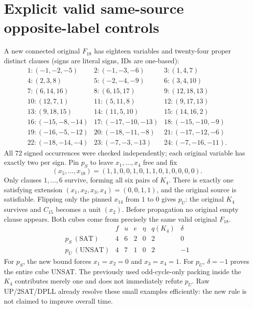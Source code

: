 \documentclass[11pt]{article}
\begin{document}
\section{Explicit valid same-source opposite-label controls}
A new connected original $F_{18}$ has eighteen variables and twenty-four proper distinct clauses (signs are literal signs, IDs are one-based):
\[
\begin{array}{rll}
1:(-1,-2,-5)&2:(-1,-3,-6)&3:(1,4,7)\\
4:(2,3,8)&5:(-2,-4,-9)&6:(3,4,10)\\
7:(6,14,16)&8:(6,15,17)&9:(12,18,13)\\
10:(12,7,1)&11:(5,11,8)&12:(9,17,13)\\
13:(9,18,15)&14:(11,5,10)&15:(14,16,2)\\
16:(-15,-8,-14)&17:(-17,-10,-13)&18:(-15,-10,-9)\\
19:(-16,-5,-12)&20:(-18,-11,-8)&21:(-17,-12,-6)\\
22:(-18,-14,-4)&23:(-7,-3,-13)&24:(-7,-16,-11).
\end{array}
\]
All $72$ signed occurrences were checked independently; each original variable has exactly two per sign. Pin $p_S$ to leave $x_1,\ldots,x_4$ free and fix
\[
(x_5,\ldots,x_{18})=(1,1,0,0,1,0,1,1,0,1,0,0,0,0).
\]
Only clauses $1,\ldots,6$ survive, forming all six pairs of $K_4$. There is exactly one satisfying extension $(x_1,x_2,x_3,x_4)=(0,0,1,1)$, and the original source is satisfiable. Flipping only the pinned $x_{14}$ from $1$ to $0$ gives $p_U$: the original $K_4$ survives and $C_{15}$ becomes a unit $(x_2)$. Before propagation no original empty clause appears. Both cubes come from precisely the same valid original $F_{18}$.
\[
\begin{array}{lrrrrrr}
&f&u&e&\eta&q(K_4)&\delta\\ \hline
p_S\ (\mathrm{SAT})&4&6&2&0&2&0\\
p_U\ (\mathrm{UNSAT})&4&7&1&0&2&-1
\end{array}
\]
For $p_S$, the new bound forces $x_1=x_2=0$ and $x_3=x_4=1$. For $p_U$, $\delta=-1$ proves the entire cube UNSAT. The previously used odd-cycle-only packing inside the $K_4$ contributes merely one and does not immediately refute $p_U$. Raw UP/2SAT/DPLL already resolve these small examples efficiently: the new rule is not claimed to improve overall time.
\end{document}
